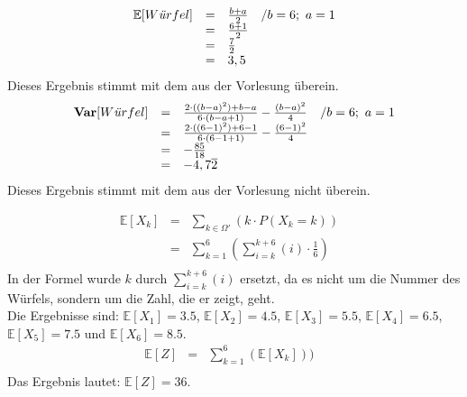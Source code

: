 \documentclass[twoside]{article}
\begin{document}
\begin{equation*}
    \begin{array}{rlll}
        \mathbb{E}[W$\textit{ü}$rfel]&=    &\frac{b + a}{2}&/b=6;~a=1\\
            &=    &\frac{6 + 1}{2}&\\
            &=    &\frac{7}{2}&\\
            &=    &3,5&\\
    \end{array}
\end{equation*}
Dieses Ergebnis stimmt mit dem aus der Vorlesung überein.
\begin{equation*}
    \begin{array}{rlll}
        \textbf{Var}[W$\textit{ü}$rfel]&=    &\frac{2 \cdot ((b-a)^2)+b-a}{6\cdot(b - a + 1)} - \frac{(b-a)^2}{4}&/b=6;~a=1\\
            &=    &\frac{2 \cdot ((6-1)^2)+6-1}{6\cdot(6 - 1 + 1)} - \frac{(6-1)^2}{4}&\\
            &=    &-\frac{85}{18}&\\
            &=    &-4,7\overline{2}&\\
    \end{array}
\end{equation*}
Dieses Ergebnis stimmt mit dem aus der Vorlesung nicht überein.


\begin{equation*}
    \begin{array}{rlll}
        \mathbb{E}[X_k]&=    &\sum_{k \in \Omega'}(k\cdot P(X_k = k))&\\
            &=    &\sum_{k=1}^{6}(\sum_{i=k}^{k+6}(i) \cdot \frac{1}{6})&\\
    \end{array}
\end{equation*}
In der Formel wurde $k$ durch $\sum_{i=k}^{k+6}(i)$ ersetzt, da es nicht um die Nummer des Würfels, sondern um die Zahl, die er zeigt, geht.
\\
Die Ergebnisse sind: $\mathbb{E}[X_1]=3.5$, $\mathbb{E}[X_2]=4.5$, $\mathbb{E}[X_3]=5.5$, $\mathbb{E}[X_4]=6.5$, $\mathbb{E}[X_5]=7.5$ und $\mathbb{E}[X_6]=8.5$.
\begin{equation*}
    \begin{array}{rlll}
        \mathbb{E}[Z]&=    &\sum_{k = 1}^{6}(\mathbb{E}[X_k]))&\\
    \end{array}
\end{equation*}
Das Ergebnis lautet: $\mathbb{E}[Z] = 36$.
\end{document}
